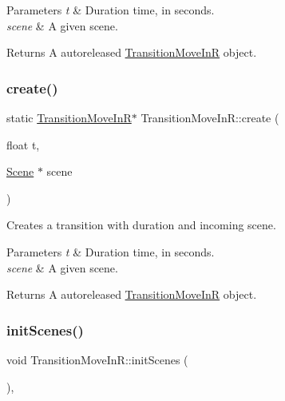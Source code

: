 \begin{DoxyParams}{Parameters}
{\em t} & Duration time, in seconds. \\
\hline
{\em scene} & A given scene. \\
\hline
\end{DoxyParams}
\begin{DoxyReturn}{Returns}
A autoreleased \hyperlink{classTransitionMoveInR}{Transition\+Move\+InR} object. 
\end{DoxyReturn}
\mbox{\label{classTransitionMoveInR_af8cc045bd473dde2f0d0af7193c61b3d}} 
\subsubsection{\texorpdfstring{create()}{create()}\hspace{0.1cm}{\footnotesize\ttfamily [2/2]}}
{\footnotesize\ttfamily static \hyperlink{classTransitionMoveInR}{Transition\+Move\+InR}$\ast$ Transition\+Move\+In\+R\+::create (\begin{DoxyParamCaption}\item[{float}]{t,  }\item[{\hyperlink{classScene}{Scene} $\ast$}]{scene }\end{DoxyParamCaption})\hspace{0.3cm}{\ttfamily [static]}}

Creates a transition with duration and incoming scene.


\begin{DoxyParams}{Parameters}
{\em t} & Duration time, in seconds. \\
\hline
{\em scene} & A given scene. \\
\hline
\end{DoxyParams}
\begin{DoxyReturn}{Returns}
A autoreleased \hyperlink{classTransitionMoveInR}{Transition\+Move\+InR} object. 
\end{DoxyReturn}
\mbox{\label{classTransitionMoveInR_ab9629d0b43632bd10024dbe79b15d411}} 
\subsubsection{\texorpdfstring{init\+Scenes()}{initScenes()}\hspace{0.1cm}{\footnotesize\ttfamily [1/2]}}
{\footnotesize\ttfamily void Transition\+Move\+In\+R\+::init\+Scenes (\begin{DoxyParamCaption}{ }\end{DoxyParamCaption})\hspace{0.3cm}{\ttfamily [protected]}, {\ttfamily [virtual]}}

